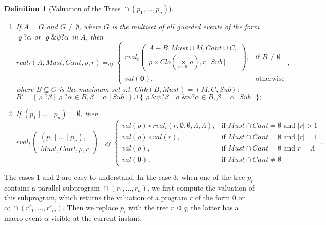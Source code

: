 \documentclass{fcs}
\newtheorem{mydef}{Definition}[section]
\newcommand{\halt}[0]{\mathbf{0}}
\newcommand{\val}[0]{\mathit{val}}
\DeclareMathOperator{\seq}{;}
\DeclareMathOperator{\para}{\cap}
\newcommand{\none}[0]{\Lambda}
\newcommand{\Must}[0]{\mathit{Must}}
\newcommand{\Cannot}[0]{\mathit{Cant}}
\newcommand{\Chk}[0]{\mathit{Chk}}
\newcommand{\Closed}[0]{\mathit{Clo}}
\newcommand{\rfval}[0]{\mathit{rval}_t}
\DeclareMathOperator{\sep}{|}
\DeclareMathOperator{\link}{\unlhd}
\newcommand{\dddef}[0]{=_{df}}
\begin{document}
\begin{mydef}[Valuation of the Trecs $\para(p_1,...,p_n)$]
\begin{enumerate}
		\ifx
		\item If $A = G$ and $G\neq \emptyset$, where $G$ is the multiset of all guarded events of the form $\varrho?\alpha$ or $\varrho\& \psi?\alpha$ in $A$,
		then
		$$\rfval(A, \Must, \Cannot, \rho, r)\dddef \left\{\begin{array}{ll}
		\rfval	\left(\begin{gathered}A - B, \Must\uplus M, \Cannot\cup C,\\
		\rho\times \Closed(\underset{^{a\in B'}}{\times}a), r[\mathit{Sub}]\end{gathered}\right), &\mbox{if $B\neq \emptyset$}\\
		\val(\halt),  &\mbox{otherwise}
		\end{array}
		\right.,$$
		where $B\subseteq G$ is the maximum set s.t. $\Chk(B, \Must) = (M, C, \mathit{Sub})$;
		$$B' = \{\varrho?\beta\ |\ \varrho?\alpha\in B, \beta = \alpha[\mathit{Sub}]\}\cup \{\varrho\& \psi?\beta\ |\ \varrho\& \psi?\alpha\in B, \beta = \alpha[\mathit{Sub}]\};$$
		\fi
		
		\ifx
		\item If $(p_1\sep...\sep p_n) = \emptyset$, then
		$$\rfval\left(\begin{gathered}(p_1\sep...\sep p_n), \\
		\Must, \Cannot, \rho, r\end{gathered}\right)
		\dddef \left\{
		\begin{array}{ll}
		\val(\rho)\circ \rfval(r, \emptyset, \emptyset, \none, \none), &\mbox{if $\Must\cap \Cannot = \emptyset$ and $|r|>1$}\\
		\val(\rho)\circ \val(r), &\mbox{if $\Must\cap \Cannot = \emptyset$ and $|r|=1$}\\
		\val(\rho), &\mbox{if $\Must\cap \Cannot = \emptyset$ and $r = \none$}\\
		\val(\halt),  &\mbox{if $\Must\cap \Cannot \neq \emptyset$}
		\end{array}
		\right..$$
		\fi
	\end{enumerate}
\end{mydef}



The cases 1 and 2 are easy to understand.
In the case 3, when one of the trec $p_i$ contains a parallel subprogram $\para(r_1,...,r_n)$, we first compute the valuation of this subprogram, which returns the valuation of a program $r$ of the form $\halt$ or $\alpha\seq \para(r'_1,...,r'_m)$.
Then we replace $p_i$ with the trec $r\link q$, the latter has a macro event $\alpha$ visible at the current instant.
\end{document}
